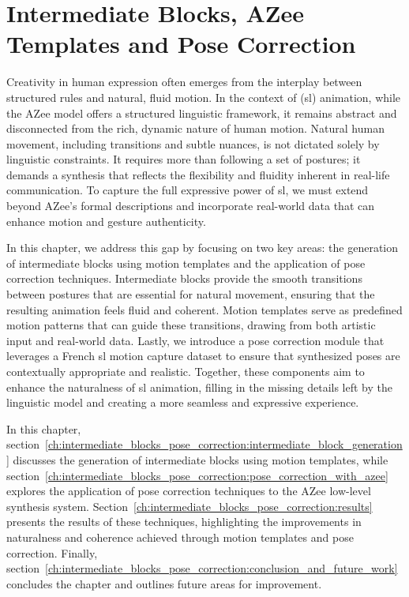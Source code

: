 \documentclass[../../main.tex]{subfiles}
\begin{document}
\chapter{Intermediate Blocks, AZee Templates and Pose Correction}
\label{ch:intermediate_blocks_pose_correction}

Creativity in human expression often emerges from the interplay between structured rules and natural, fluid motion. In the context of (\gls{sl}) animation, while the AZee model offers a structured linguistic framework, it remains abstract and disconnected from the rich, dynamic nature of human motion. Natural human movement, including transitions and subtle nuances, is not dictated solely by linguistic constraints. It requires more than following a set of postures; it demands a synthesis that reflects the flexibility and fluidity inherent in real-life communication. To capture the full expressive power of \gls{sl}, we must extend beyond AZee's formal descriptions and incorporate real-world data that can enhance motion and gesture authenticity.

In this chapter, we address this gap by focusing on two key areas: the generation of intermediate blocks using motion templates and the application of pose correction techniques. Intermediate blocks provide the smooth transitions between postures that are essential for natural movement, ensuring that the resulting animation feels fluid and coherent. Motion templates serve as predefined motion patterns that can guide these transitions, drawing from both artistic input and real-world data. Lastly, we introduce a pose correction module that leverages a French \gls{sl} motion capture dataset to ensure that synthesized poses are contextually appropriate and realistic. Together, these components aim to enhance the naturalness of \gls{sl} animation, filling in the missing details left by the linguistic model and creating a more seamless and expressive experience.

In this chapter, section~\ref{ch:intermediate_blocks_pose_correction:intermediate_block_generation} discusses the generation of intermediate blocks using motion templates, while section~\ref{ch:intermediate_blocks_pose_correction:pose_correction_with_azee} explores the application of pose correction techniques to the AZee low-level synthesis system. Section~\ref{ch:intermediate_blocks_pose_correction:results} presents the results of these techniques, highlighting the improvements in naturalness and coherence achieved through motion templates and pose correction. Finally, section~\ref{ch:intermediate_blocks_pose_correction:conclusion_and_future_work} concludes the chapter and outlines future areas for improvement.
\end{document}
